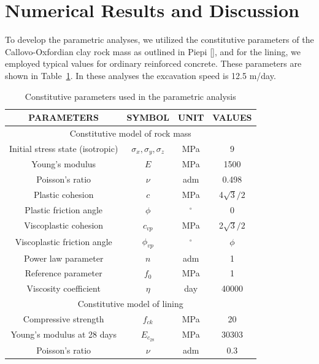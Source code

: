 \documentclass[a4paper,fleqn]{cas-sc}
\begin{document}
\section{Numerical Results and Discussion}\label{}

To develop the parametric analyses, we utilized the constitutive parameters of the Callovo-Oxfordian clay rock mass as outlined in Piepi [], and for the lining, we employed typical values for ordinary reinforced concrete. These parameters are shown in Table~\ref{table2}. In these analyses the excavation speed is 12.5 m/day.
\begin{table}
	\caption{Constitutive parameters used in the parametric analysis}
	\label{table2}
	\centering
	\renewcommand{\arraystretch}{1.25}
	\begin{tabular}{c c c c}
		\hline
		\multicolumn{1}{c}{PARAMETERS} &
		\multicolumn{1}{c}{SYMBOL} &
		\multicolumn{1}{c}{UNIT} &
		\multicolumn{1}{c}{VALUES} \\
		\hline
		\multicolumn{4}{c}{Constitutive model of rock mass} \\
		\hline
		Initial stress state (isotropic) & $\sigma_x, \sigma_y, \sigma_z$ & MPa & 9 \\
		Young's modulus & $E$ & MPa & 1500 \\
		Poisson's ratio & $\nu$ & adm & 0.498 \\
		Plastic cohesion & $c$ & MPa & 4$\sqrt{3}/2$ \\
		Plastic friction angle & $\phi$ & $^{\circ}$ & 0 \\
		Viscoplastic cohesion & $c_{vp}$ & MPa & 2$\sqrt{3}/2$ \\
		Viscoplastic friction angle & $\phi_{vp}$ & $^{\circ}$ & $\phi$ \\
		Power law parameter & $n$ & adm & 1 \\
		Reference parameter & $f_0$ & MPa & 1 \\
		Viscosity coefficient & $\eta$ & day & 40000 \\
		\hline
		\multicolumn{4}{c}{Constitutive model of lining} \\
		\hline
		
		Compressive strength & $f_{ck}$ & MPa & 20 \\
		Young's modulus at 28 days & $E_{c_{28}}$ & MPa & $30303$ \\
		Poisson's ratio & $\nu$ & adm & 0.3 \\
		

\end{tabular}
\end{table}
\end{document}
